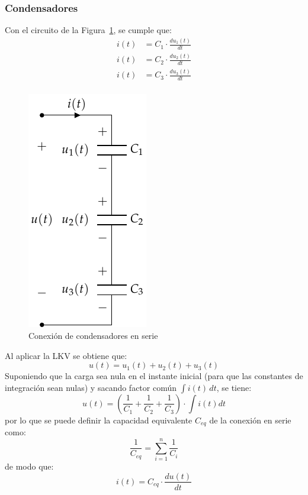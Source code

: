         \subsubsection{Condensadores}
        Con el circuito de la Figura~\ref{fig:condensadores-serie}, se
        cumple que:
        \begin{align*}
          i(t) &= C_1 \cdot \frac{du_1(t)}{dt}\\
          i(t) &= C_2 \cdot \frac{du_2(t)}{dt}\\
          i(t) &= C_3 \cdot \frac{du_3(t)}{dt}\\
        \end{align*}
        \begin{figure}[H]
          \centering
          \includegraphics[width=0.2\linewidth]{../figs/CondensadoresSerie.pdf}
          \caption{Conexión de condensadores en serie}
          \label{fig:condensadores-serie}
        \end{figure}
        Al aplicar la LKV se obtiene que:
        \begin{equation*}
          u(t) = u_1(t) + u_2(t) + u_3(t)
        \end{equation*}
        Suponiendo que la carga sea nula en el instante inicial (para
        que las constantes de integración sean nulas) y sacando factor
        común $\int i(t)\,dt$, se tiene:
        \begin{equation*}
          u(t)=\left(\dfrac{1}{C_1}+\dfrac{1}{C_2}+\dfrac{1}{C_3} \right)\cdot \int i(t) dt
        \end{equation*}
        por lo que se puede definir la capacidad equivalente $C_{eq}$
        de la conexión en serie como:
        \begin{equation}
          \boxed{\dfrac{1}{C_{eq}} = \sum_{i = 1}^n \dfrac{1}{C_i}}
        \end{equation}
        de modo que:
        \begin{equation*}
          i(t) = C_{eq} \cdot \frac{du(t)}{dt}
        \end{equation*}
		
